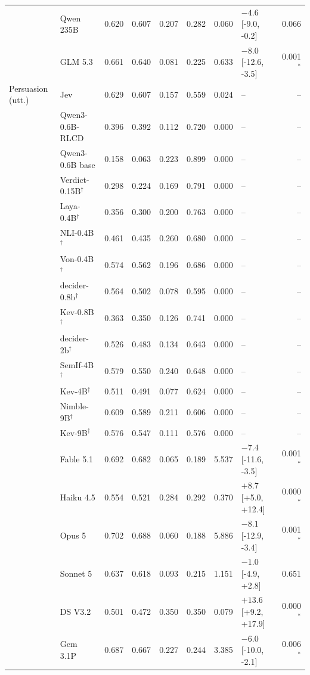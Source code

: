 \begin{longtable}{llrrrrrlr}
 & Qwen 235B & 0.620 & 0.607 & 0.207 & 0.282 & 0.060 & $-4.6$ [-9.0, -0.2] & 0.066 \\
 & GLM 5.3 & 0.661 & 0.640 & 0.081 & 0.225 & 0.633 & $-8.0$ [-12.6, -3.5] & 0.001$^{*}$ \\
\midrule
Persuasion (utt.) & Jev & 0.629 & 0.607 & 0.157 & 0.559 & 0.024 & -- & -- \\
 & Qwen3-0.6B-RLCD & 0.396 & 0.392 & 0.112 & 0.720 & 0.000 & -- & -- \\
 & Qwen3-0.6B base & 0.158 & 0.063 & 0.223 & 0.899 & 0.000 & -- & -- \\
 & Verdict-0.15B$^{\dagger}$ & 0.298 & 0.224 & 0.169 & 0.791 & 0.000 & -- & -- \\
 & Laya-0.4B$^{\dagger}$ & 0.356 & 0.300 & 0.200 & 0.763 & 0.000 & -- & -- \\
 & NLI-0.4B$^{\dagger}$ & 0.461 & 0.435 & 0.260 & 0.680 & 0.000 & -- & -- \\
 & Von-0.4B$^{\dagger}$ & 0.574 & 0.562 & 0.196 & 0.686 & 0.000 & -- & -- \\
 & decider-0.8b$^{\dagger}$ & 0.564 & 0.502 & 0.078 & 0.595 & 0.000 & -- & -- \\
 & Kev-0.8B$^{\dagger}$ & 0.363 & 0.350 & 0.126 & 0.741 & 0.000 & -- & -- \\
 & decider-2b$^{\dagger}$ & 0.526 & 0.483 & 0.134 & 0.643 & 0.000 & -- & -- \\
 & SemIf-4B$^{\dagger}$ & 0.579 & 0.550 & 0.240 & 0.648 & 0.000 & -- & -- \\
 & Kev-4B$^{\dagger}$ & 0.511 & 0.491 & 0.077 & 0.624 & 0.000 & -- & -- \\
 & Nimble-9B$^{\dagger}$ & 0.609 & 0.589 & 0.211 & 0.606 & 0.000 & -- & -- \\
 & Kev-9B$^{\dagger}$ & 0.576 & 0.547 & 0.111 & 0.576 & 0.000 & -- & -- \\
 & Fable 5.1 & 0.692 & 0.682 & 0.065 & 0.189 & 5.537 & $-7.4$ [-11.6, -3.5] & 0.001$^{*}$ \\
 & Haiku 4.5 & 0.554 & 0.521 & 0.284 & 0.292 & 0.370 & $+8.7$ [+5.0, +12.4] & 0.000$^{*}$ \\
 & Opus 5 & 0.702 & 0.688 & 0.060 & 0.188 & 5.886 & $-8.1$ [-12.9, -3.4] & 0.001$^{*}$ \\
 & Sonnet 5 & 0.637 & 0.618 & 0.093 & 0.215 & 1.151 & $-1.0$ [-4.9, +2.8] & 0.651 \\
 & DS V3.2 & 0.501 & 0.472 & 0.350 & 0.350 & 0.079 & $+13.6$ [+9.2, +17.9] & 0.000$^{*}$ \\
 & Gem 3.1P & 0.687 & 0.667 & 0.227 & 0.244 & 3.385 & $-6.0$ [-10.0, -2.1] & 0.006$^{*}$ \\

\end{longtable}
